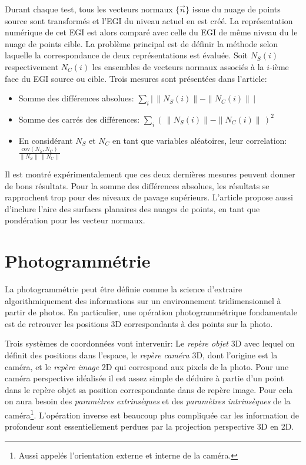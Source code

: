 \documentclass[a4paper,10pt]{scrreprt}
\begin{document}
Durant chaque test, tous les vecteurs normaux $\{ \vec{n} \}$ issue du nuage de points source sont transformés et l'EGI du niveau actuel en est créé. La représentation numérique de cet EGI est alors comparé avec celle du EGI de même niveau du le nuage de points cible. La problème principal est de définir la méthode selon laquelle la correspondance de deux représentations est évaluée. Soit $N_S(i)$ respectivement $N_C(i)$ les ensembles de vecteurs normaux associés à la $i$-ième face du EGI source ou cible. Trois mesures sont présentées dans l'article:
\begin{itemize}
	\item Somme des différences absolues: $\sum_{i} \left| \, \|N_S(i)\| - \|N_C(i)\| \, \right|$
	\item Somme des carrés des différences: $\sum_{i} \left( \, \|N_S(i)\| - \|N_C(i)\| \, \right)^2$
	\item En considérant $N_S$ et $N_C$ en tant que variables aléatoires, leur correlation: $\frac{\text{cov}(N_S, N_C)}{\|N_S\| \, \|N_C\|}$
\end{itemize}
Il est montré expérimentalement que ces deux dernières mesures peuvent donner de bons résultats. Pour la somme des différences absolues, les résultats se rapprochent trop pour des niveaux de pavage supérieurs. L'article propose aussi d'inclure l'aire des surfaces planaires des nuages de points, en tant que pondération pour les vecteur normaux.



\section{Photogrammétrie}
La photogrammétrie peut être définie comme la science d'extraire algorithmiquement des informations sur un environnement tridimensionnel à partir de photos. En particulier, une opération photogrammétrique fondamentale est de retrouver les positions 3D correspondants à des points sur la photo.

Trois systèmes de coordonnées vont intervenir: Le \emph{repère objet} 3D avec lequel on définit des positions dans l'espace, le \emph{repère caméra} 3D, dont l'origine est la caméra, et le \emph{repère image} 2D qui correspond aux pixels de la photo. Pour une caméra perspective idéalisée il est assez simple de déduire à partie d'un point dans le repère objet sa position correspondante dans de repère image. Pour cela on aura besoin des \emph{paramètres extrinsèques} et des \emph{paramètres intrinsèques} de la caméra\footnote{Aussi appelés l'orientation externe et interne de la caméra.}. L'opération inverse est beaucoup plus compliquée car les information de profondeur sont essentiellement perdues par la projection perspective 3D en 2D.
\end{document}
